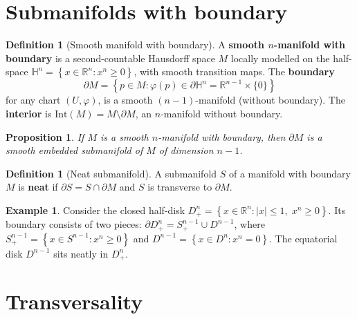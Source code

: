 \documentclass[12pt,a4paper,openany]{book}
\newtheorem{proposition}[theorem]{Proposition}
\theoremstyle{definition}
\newtheorem{definition}[theorem]{Definition}
\newtheorem{example}[theorem]{Example}
\theoremstyle{remark}
\newcommand{\R}{\mathbb{R}}
\newcommand{\abs}[1]{\left\lvert #1 \right\rvert}
\newcommand{\set}[1]{\left\{ #1 \right\}}
\begin{document}
\section{Submanifolds with boundary}\label{sec:submanifold-boundary}

\begin{definition}[Smooth manifold with boundary]\label{def:mfld-boundary}%
A \textbf{smooth $n$-manifold with boundary} is a second-countable
Hausdorff space $M$ locally modelled on the half-space
$\mathbb{H}^n = \set{x \in \R^n : x^n \geq 0}$, with smooth transition
maps.  The \textbf{boundary}
\[
  \partial M = \set{p \in M : \varphi(p) \in \partial\mathbb{H}^n
  = \R^{n-1} \times \{0\}}
\]
for any chart $(U, \varphi)$, is a smooth $(n-1)$-manifold (without
boundary).  The \textbf{interior} is
$\mathrm{Int}(M) = M \setminus \partial M$, an $n$-manifold without
boundary.
\end{definition}

\begin{proposition}\label{prop:boundary-submanifold}
If $M$ is a smooth $n$-manifold with boundary, then $\partial M$ is a
smooth embedded submanifold of $M$ of dimension $n-1$.
\end{proposition}

\begin{definition}[Neat submanifold]\label{def:neat-submanifold}%
A submanifold $S$ of a manifold with boundary $M$ is \textbf{neat} if
$\partial S = S \cap \partial M$ and $S$ is transverse to $\partial M$.
\end{definition}

\begin{example}\label{ex:half-disk}
Consider the closed half-disk
$D^n_+ = \set{x \in \R^n : \abs{x} \leq 1,\; x^n \geq 0}$.
Its boundary consists of two pieces:
$\partial D^n_+ = S^{n-1}_+ \cup D^{n-1}$, where
$S^{n-1}_+ = \set{x \in S^{n-1} : x^n \geq 0}$ and
$D^{n-1} = \set{x \in D^n : x^n = 0}$.
The equatorial disk $D^{n-1}$ sits neatly in $D^n_+$.
\end{example}

\section{Transversality}\label{sec:transversality}
\end{document}
